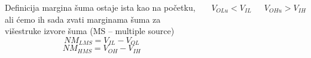 \begin{frame}[label=08-s024]
\gusttekst\begin{columns}[T,onlytextwidth]\centering
\par\medskip\raggedright
Definicija margina šuma ostaje ista kao na početku, ali ćemo ih sada zvati marginama šuma za višestruke izvore šuma (MS – multiple source)
\[NM_{LMS}=V_{IL}-V_{OL}\]
\[NM_{HMS}=V_{OH}-V_{IH}\]
\centering\par\medskip
$V_{OLu}<V_{IL}$\par\medskip$V_{OHu}>V_{IH}$
\end{columns}
\end{frame}
